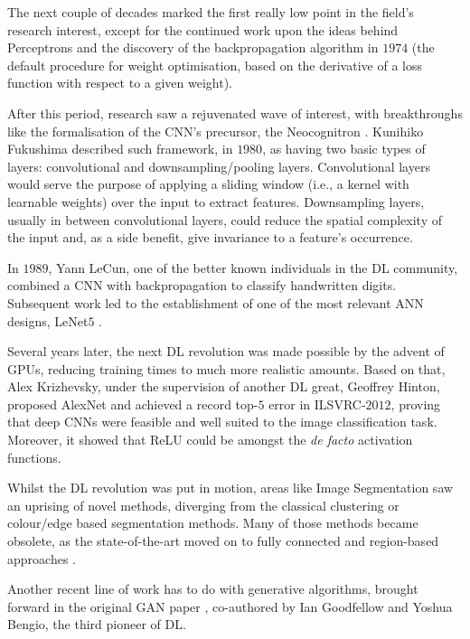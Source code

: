 The next couple of decades marked the first really low point in the field's research interest, except for the continued work upon the ideas behind Perceptrons and the discovery of the backpropagation algorithm in $1974$ (the default procedure for weight optimisation, based on the derivative of a loss function with respect to a given weight).

After this period, research saw a rejuvenated wave of interest, with breakthroughs like the formalisation of the \ac{CNN}'s precursor, the Neocognitron \cite{neocognitron}. Kunihiko Fukushima described such framework, in $1980$, as having two basic types of layers: convolutional and downsampling/pooling layers. Convolutional layers would serve the purpose of applying a sliding window (i.e., a kernel with learnable weights) over the input to extract features. Downsampling layers, usually in between convolutional layers, could reduce the spatial complexity of the input and, as a side benefit, give invariance to a feature's occurrence. 

In $1989$, Yann LeCun, one of the better known individuals in the \ac{DL} community, combined a \ac{CNN} with backpropagation to classify handwritten digits. Subsequent work led to the establishment of one of the most relevant \ac{ANN} designs, LeNet$5$ \cite{lenet5}.

Several years later, the next \ac{DL} revolution was made possible by the advent of \ac{GPU}s, reducing training times to much more realistic amounts. Based on that, Alex Krizhevsky, under the supervision of another \ac{DL} great, Geoffrey Hinton, proposed AlexNet \cite{alexnet} and achieved a record top-$5$ error in \ac{ILSVRC}-$2012$, proving that deep \ac{CNN}s were feasible and well suited to the image classification task. Moreover, it showed that \ac{ReLU} could be amongst the \textit{de facto} activation functions.

Whilst the \ac{DL} revolution was put in motion, areas like Image Segmentation saw an uprising of novel methods, diverging from the classical clustering or colour/edge based segmentation methods. Many of those methods became obsolete, as the state-of-the-art moved on to fully connected and region-based approaches \cite{review_of_semantic_segmentation}.

Another recent line of work has to do with generative algorithms, brought forward in the original \ac{GAN} paper \cite{goodfellow}, co-authored by Ian Goodfellow and Yoshua Bengio, the third pioneer of \ac{DL}. \\

